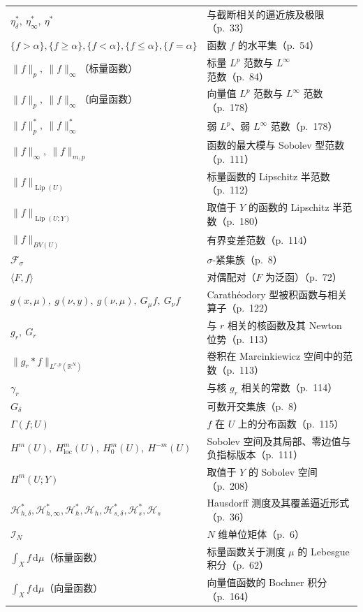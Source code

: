 \documentclass[../main.tex]{subfiles}
\begin{document}
\begin{longtable}{p{}p{}}
$\eta_\delta^*,\ \eta_\infty^*,\ \eta^*$ & 与截断相关的逼近族及极限（p.~33）\\
$\{f>\alpha\},\{f\geqslant\alpha\},\{f<\alpha\},\{f\leqslant\alpha\},\{f=\alpha\}$ & 函数 $f$ 的水平集（p.~54）\\
$\|f\|_p,\ \|f\|_\infty$（标量函数） & 标量 $L^p$ 范数与 $L^\infty$ 范数（p.~84）\\
$\|f\|_p,\ \|f\|_\infty$（向量函数） & 向量值 $L^p$ 范数与 $L^\infty$ 范数（p.~178）\\
$\|f\|_p^*,\ \|f\|_\infty^*$ & 弱 $L^p$、弱 $L^\infty$ 范数（p.~178）\\
$\|f\|_\infty,\ \|f\|_{m,p}$ & 函数的最大模与 Sobolev 型范数（p.~111）\\
$\|f\|_{\operatorname{Lip}(U)}$ & 标量函数的 Lipschitz 半范数（p.~112）\\
$\|f\|_{\operatorname{Lip}(U;Y)}$ & 取值于 $Y$ 的函数的 Lipschitz 半范数（p.~180）\\
$\|f\|_{BV(U)}$ & 有界变差范数（p.~114）\\
$\mathcal{F}_\sigma$ & $\sigma$-紧集族（p.~8）\\
$\langle F,f\rangle$ & 对偶配对（$F$ 为泛函）（p.~72）\\
$g(x,\mu),\ g(\nu,y),\ g(\nu,\mu),\ G_\mu f,\ G_\nu f$ & Carathéodory 型被积函数与相关算子（p.~122）\\
$g_r,\ G_r$ & 与 $r$ 相关的核函数及其 Newton 位势（p.~113）\\
$\|g_r*f\|_{L^{r,p}(\mathbb{R}^N)}$ & 卷积在 Marcinkiewicz 空间中的范数（p.~113）\\
$\gamma_r$ & 与核 $g_r$ 相关的常数（p.~114）\\
$G_\delta$ & 可数开交集族（p.~8）\\
$\Gamma(f;U)$ & $f$ 在 $U$ 上的分布函数（p.~115）\\
$H^m(U),\ H^m_{\mathrm{loc}}(U),\ H^m_0(U),\ H^{-m}(U)$ & Sobolev 空间及其局部、零边值与负指标版本（p.~111）\\
$H^m(U;Y)$ & 取值于 $Y$ 的 Sobolev 空间（p.~208）\\
$\mathcal{H}^*_{h,\delta},\mathcal{H}^*_{h,\infty},\mathcal{H}^*_h,\mathcal{H}_h,\mathcal{H}^*_{s,\delta},\mathcal{H}^*_s,\mathcal{H}_s$ & Hausdorff 测度及其覆盖逼近形式（p.~36）\\
$\mathcal{I}_N$ & $N$ 维单位矩体（p.~6）\\
$\int_X f\,\mathrm{d}\mu$（标量函数） & 标量函数关于测度 $\mu$ 的 Lebesgue 积分（p.~62）\\
$\int_X f\,\mathrm{d}\mu$（向量函数） & 向量值函数的 Bochner 积分（p.~164）\\

\end{longtable}
\end{document}
